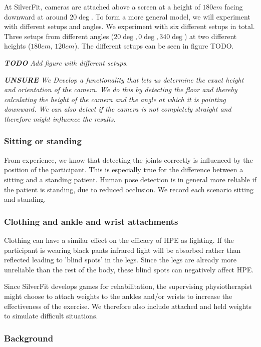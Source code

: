 At SilverFit, cameras are attached above a screen at a height of $180 cm$ facing downward at around $20\deg$. To form a more general model, we will experiment with different setups and angles. We experiment with six different setups in total. Three setups from different angles ($20\deg, 0\deg, 340\deg$) at two different heights ($180cm$, $120cm$). The different setups can be seen in figure TODO.

\textit{\textbf{TODO} Add figure with different setups.}

\textit{
  \textbf{UNSURE} We Develop a functionality that lets us determine the exact height and orientation of the camera. We do this by detecting the floor and thereby calculating the height of the camera and the angle at which it is pointing downward. We can also detect if the camera is not completely straight and therefore might influence the results.
}

\subsubsection{Sitting or standing}

From experience, we know that detecting the joints correctly is influenced by the position of the participant. This is especially true for the difference between a sitting and a standing patient. Human pose detection is in general more reliable if the patient is standing, due to reduced occlusion. We record each scenario sitting and standing.

\subsubsection{Clothing and ankle and wrist attachments}

Clothing can have a similar effect on the efficacy of HPE as lighting. If the participant is wearing black pants infrared light will be absorbed rather than reflected leading to 'blind spots' in the legs. Since the legs are already more unreliable than the rest of the body, these blind spots can negatively affect HPE. 

Since SilverFit develops games for rehabilitation, the supervising physiotherapist might choose to attach weights to the ankles and/or wrists to increase the effectiveness of the exercise. We therefore also include attached and held weights to simulate difficult situations.

\subsubsection{Background}

